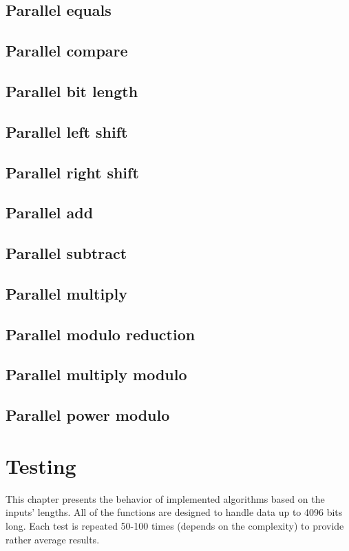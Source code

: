 \documentclass[oneside,openright,12pt,final,en]{mgr}
\begin{document}
\section{Parallel equals}
\section{Parallel compare}
\section{Parallel bit length}
\section{Parallel left shift}
\section{Parallel right shift}
\section{Parallel add}
\section{Parallel subtract}
\section{Parallel multiply}
\section{Parallel modulo reduction}
\section{Parallel multiply modulo}
\section{Parallel power modulo}

\chapter{Testing}
This chapter presents the behavior of implemented algorithms based on the inputs' lengths. All of the functions are designed to handle data up to 4096 bits long. Each test is repeated 50-100 times (depends on the complexity) to provide rather average results.  
\end{document}
